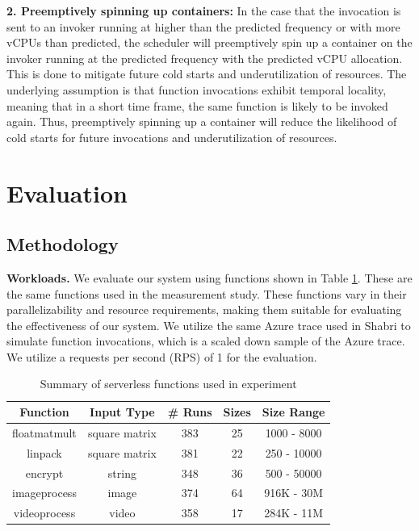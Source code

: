 \documentclass[times, 10pt,twocolumn]{article}
\begin{document}
\textbf{2. Preemptively spinning up containers: } In the case that the invocation is sent to an invoker running at higher than the predicted frequency or with more vCPUs than predicted, the scheduler will preemptively spin up a container on the invoker running at the predicted frequency with the predicted vCPU allocation. This is done to mitigate future cold starts and underutilization of resources. The underlying assumption is that function invocations exhibit temporal locality, meaning that in a short time frame, the same function is likely to be invoked again. Thus, preemptively spinning up a container will reduce the likelihood of cold starts for future invocations and underutilization of resources.

\section{Evaluation}

\subsection{Methodology}
\textbf{Workloads.} We evaluate our system using functions shown in Table \ref{tab:summary_of_serverless_functions}. These are the same functions used in the measurement study. These functions vary in their parallelizability and resource requirements, making them suitable for evaluating the effectiveness of our system. We utilize the same Azure trace used in Shabri \cite{sinha2024shabari} to simulate function invocations, which is a scaled down sample of the Azure trace. We utilize a requests per second (RPS) of 1 for the evaluation.

\begin{table}[htbp]
  \centering
  \begin{tabular}{|c|c|c|c|c|}
  \hline
  \textbf{Function} & \textbf{Input Type} & \textbf{\# Runs} & \textbf{Sizes} & \textbf{Size Range} \\ \hline
  floatmatmult & square matrix & 383 & 25 & 1000 - 8000 \\ \hline
  linpack & square matrix & 381 & 22 & 250 - 10000 \\ \hline
  encrypt & string & 348 & 36 & 500 - 50000 \\ \hline
  imageprocess & image & 374 & 64 & 916K - 30M \\ \hline
  videoprocess & video & 358 & 17 & 284K - 11M \\ \hline
  \end{tabular}
  \caption{Summary of serverless functions used in experiment}
  \label{tab:summary_of_serverless_functions}
\end{table}
\end{document}
